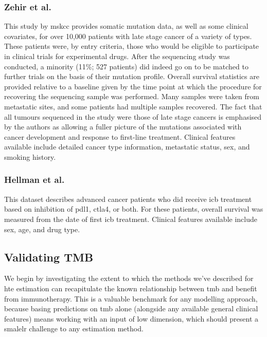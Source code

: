 \documentclass[../thesis.tex]{subfiles}
\begin{document}
\subsubsection*{Zehir et al.}
This study by \gls{mskcc} provides somatic mutation data, as well as some clinical covariates, for over 10,000 patients with late stage cancer of a variety of types. These patients were, by entry criteria, those who would be eligible to participate in clinical trials for experimental drugs. After the sequencing study was conducted, a minority (11\%; 527 patients) did indeed go on to be matched to further trials on the basis of their mutation profile. Overall survival statistics are provided relative to a baseline given by the time point at which the procedure for recovering the sequencing sample was performed. Many samples were taken from metastatic sites, and some patients had multiple samples recovered. The fact that all tumours sequenced in the study were those of late stage cancers is emphasised by the authors as allowing a fuller picture of the mutations associated with cancer development and response to first-line treatment. Clinical features available include detailed cancer type information, metastatic status, sex, and smoking history.

\subsubsection*{Hellman et al.}
This dataset describes advanced cancer patients who did receive \gls{icb} treatment based on inhibition of \gls{pdl1}, \gls{ctla4}, or both. For these patients, overall survival was measured from the date of first \gls{icb} treatment. Clinical features available include sex, age, and drug type.

\subsection{Validating TMB}
We begin by investigating the extent to which the methods we've described for \gls{hte} estimation can recapitulate the known relationship between \gls{tmb} and benefit from immunotherapy. This is a valuable benchmark for any modelling approach, because basing predictions on \gls{tmb} alone (alongside any available general clinical features) means working with an input of low dimension, which should present a smalelr challenge to any estimation method.
\end{document}
